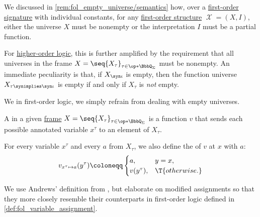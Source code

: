 \begin{remark}\label{rem:hol_empty_universe/semantics}
  We discussed in \cref{rem:fol_empty_universe/semantics} how, over a \hyperref[def:fol_signature]{first-order signature} with individual constants, for any \hyperref[def:fol_structure]{first-order structure} \( \mscrX = (X, I) \), either the universe \( X \) must be nonempty or the interpretation \( I \) must be a partial function.

  For \hyperref[def:higher_order_logic]{higher-order logic}, this is further amplified by the requirement that all universes in the frame \( X = \seq{ X_\tau }_{\tau \in \op*{\BbbQ_\Sigma}} \) must be nonempty. An immediate peculiarity is that, if \( X_{\syn\iota} \) is empty, then the function universe \( X_{\tau \synimplies \syn\iota} \) is empty if and only if \( X_\tau \) is \emph{not} empty.

  We in first-order logic, we simply refrain from dealing with empty universes.
\end{remark}

\begin{definition}\label{def:hol_variable_assignment}
  A  in a given \hyperref[def:hol_frame]{frame} \( X = \seq{ X_\tau }_{\tau \in \op*{\BbbQ_\Sigma}} \) is a function \( v \) that sends each possible annotated variable \( x^\tau \) to an element of \( X_\tau \).

  For every variable \( x^\tau \) and every \( a \) from \( X_\tau \), we also define the  of \( v \) at \( x \) with \( a \):
  \begin{equation*}
    v_{x^\tau \mapsto a}(y^\tau) \coloneqq \begin{cases}
      a,         &y = x, \\
      v(y^\tau), &\T{otherwise.}
    \end{cases}
  \end{equation*}
\end{definition}
\begin{comments}
  \item We use Andrews' definition from \cite[238]{Andrews2002Logic}, but elaborate on modified assignments so that they more closely resemble their counterparts in first-order logic defined in \cref{def:fol_variable_assignment}.
\end{comments}

